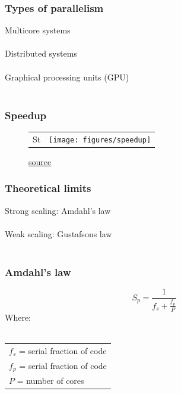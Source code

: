 \documentclass{beamer}
\begin{document}
\begin{frame}
	\frametitle{Types of parallelism}
	\begin{center}
		Multicore systems \\~\\
		
		Distributed systems \\~\\
		
		Graphical processing units (GPU) \\~\\
	\end{center}
\end{frame}

\begin{frame}
	\frametitle{Speedup}
	\begin{figure}[t]
		\begin{center}
			\begin{tabular}{ c c }
				St & \texttt{[image: figures/speedup]}	\\
			\end{tabular}
		\end{center}
		\caption{\href{https://portal.tacc.utexas.edu/c/document_library/get_file?uuid=e05d457a-0fbf-424b-87ce-c96fc0077099&groupId=13601}{source}}
	\end{figure}
\end{frame}

\begin{frame}
	\frametitle{Theoretical limits}
	\begin{center}
		Strong scaling: Amdahl's law \\~\\
		
		Weak scaling: Gustafsons law \\~\\
	\end{center}
\end{frame}

\begin{frame}
	\frametitle{Amdahl's law}
	\begin{center}
		\begin{equation*}
			S_p = \frac{1}{f_s + \frac{f_p}{P}}
		\end{equation*}
		Where: \\~\\
		\begin{tabular}{ l }
		$f_s$ = serial fraction of code \\
		$f_p$ = serial fraction of code \\
		$P$ = number of cores \\
		\end{tabular}
	\end{center}
\end{frame}
\end{document}
